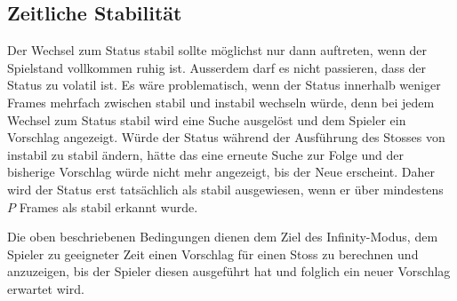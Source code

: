 \subsection{Zeitliche Stabilität}
Der Wechsel zum Status stabil sollte möglichst nur dann auftreten, wenn der Spielstand vollkommen ruhig ist.
Ausserdem darf es nicht passieren, dass der Status zu volatil ist.
Es wäre problematisch, wenn der Status innerhalb weniger Frames mehrfach zwischen stabil und instabil wechseln würde,
denn bei jedem Wechsel zum Status stabil wird eine Suche ausgelöst und dem Spieler ein Vorschlag angezeigt.
Würde der Status während der Ausführung des Stosses von instabil zu stabil ändern, hätte das eine erneute Suche zur Folge
und der bisherige Vorschlag würde nicht mehr angezeigt, bis der Neue erscheint.
Daher wird der Status erst tatsächlich als stabil ausgewiesen, wenn er über mindestens $P$ Frames als stabil erkannt wurde.

Die oben beschriebenen Bedingungen dienen dem Ziel des Infinity-Modus, dem Spieler zu geeigneter Zeit
einen Vorschlag für einen Stoss zu berechnen und anzuzeigen, bis der Spieler diesen ausgeführt hat
und folglich ein neuer Vorschlag erwartet wird.
